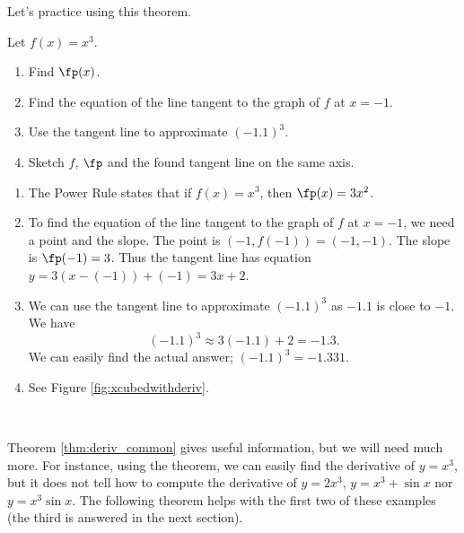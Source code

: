 \enlargethispage{1\baselineskip}
Let's practice using this theorem.\\

{Let $f(x)=x^3$. 

		\begin{enumerate}
		\item		Find $\fp(x)$.
		\item		Find the equation of the line tangent to the graph of $f$ at $x=-1$. 
		\item		Use the tangent line to approximate $(-1.1)^3$.
		\item		Sketch $f$, $\fp$ and the found tangent line on the same axis.
		\end{enumerate}
}
{	\begin{enumerate}
\enlargethispage{\baselineskip}
		\item		The Power Rule states that if $f(x) = x^3$, then $\fp(x) = 3x^2$. 

		\item		To find the equation of the line tangent to the graph of $f$ at $x=-1$, we need a point and the slope. The point is $(-1,f(-1)) = (-1, -1)$. The slope is $\fp(-1)= 3$. Thus the tangent line has equation $y = 3(x-(-1))+(-1) = 3x+2$. 
		
		\item		We can use the tangent line to approximate $(-1.1)^3$ as $-1.1$ is close to $-1$. We have $$(-1.1)^3 \approx 3(-1.1)+2 = -1.3.$$
			We can easily find the actual answer; $(-1.1)^3 = -1.331$. 
		
		\item		See Figure \ref{fig:xcubedwithderiv}.
		\end{enumerate}
\baselineskip
}\\
\clearpage

Theorem \ref{thm:deriv_common} gives useful information, but we will need much more. For instance, using the theorem, we can easily find the derivative of $y=x^3$, but it does not tell how to compute the derivative of $y=2x^3$, $y=x^3+\sin x$ nor $y=x^3\sin x$. The following theorem helps with the first two of these examples (the third is answered in the next section).
\enlargethispage{\baselineskip}

